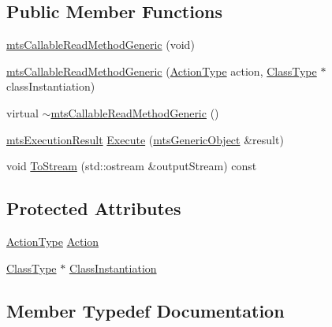 \subsection*{Public Member Functions}
\begin{DoxyCompactItemize}
\item 
\hyperlink{classmts_callable_read_method_generic_a7c144d5960ed81dca3fcb832f4f93075}{mts\+Callable\+Read\+Method\+Generic} (void)
\item 
\hyperlink{classmts_callable_read_method_generic_afb63b9256c99d419bf008fe8e90afc87}{mts\+Callable\+Read\+Method\+Generic} (\hyperlink{classmts_callable_read_method_generic_a0f8662a2b477512a0cfa147cc8faa555}{Action\+Type} action, \hyperlink{classmts_callable_read_method_generic_afa0ef401d0f5538af2f0fe114ad9202d}{Class\+Type} $\ast$class\+Instantiation)
\item 
virtual \hyperlink{classmts_callable_read_method_generic_a1fec0dfdfb8bb6ce918071d1d5011aaa}{$\sim$mts\+Callable\+Read\+Method\+Generic} ()
\item 
\hyperlink{classmts_execution_result}{mts\+Execution\+Result} \hyperlink{classmts_callable_read_method_generic_a2c37de960f723c477637f1d79e3ae7c5}{Execute} (\hyperlink{classmts_generic_object}{mts\+Generic\+Object} \&result)
\item 
void \hyperlink{classmts_callable_read_method_generic_af15dcc735815a28319e6aeaa7564785f}{To\+Stream} (std\+::ostream \&output\+Stream) const 
\end{DoxyCompactItemize}
\subsection*{Protected Attributes}
\begin{DoxyCompactItemize}
\item 
\hyperlink{classmts_callable_read_method_generic_a0f8662a2b477512a0cfa147cc8faa555}{Action\+Type} \hyperlink{classmts_callable_read_method_generic_a68e6410f6fc38a56009ac9c6bab0ac68}{Action}
\item 
\hyperlink{classmts_callable_read_method_generic_afa0ef401d0f5538af2f0fe114ad9202d}{Class\+Type} $\ast$ \hyperlink{classmts_callable_read_method_generic_a78aa69ee0ab2f0c1120a4320c1315507}{Class\+Instantiation}
\end{DoxyCompactItemize}


\subsection{Member Typedef Documentation}
\hypertarget{classmts_callable_read_method_generic_a0f8662a2b477512a0cfa147cc8faa555}{}
